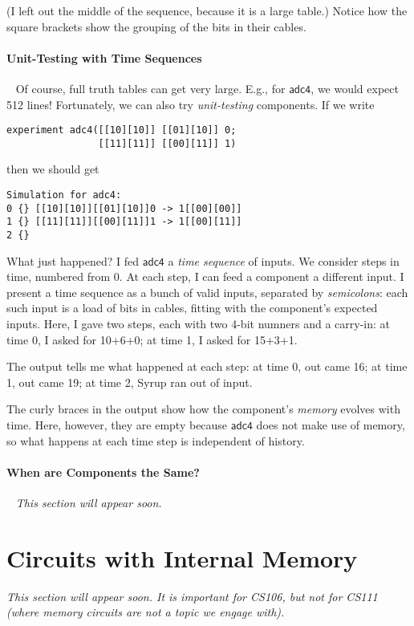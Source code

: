 \documentclass{article}
\newcommand{\C}{\mathsf}
\begin{document}
(I left out the middle of the sequence, because it is a large table.)
Notice how the square brackets show the grouping of the bits in their
cables.

\paragraph{Unit-Testing with Time Sequences}~
Of course, full truth tables can get very large. E.g., for $\C{adc4}$,
we would expect 512 lines! Fortunately, we can also try
\emph{unit-testing} components. If we write
\begin{verbatim}
experiment adc4([[10][10]] [[01][10]] 0;
                [[11][11]] [[00][11]] 1)
\end{verbatim}
then we should get
\begin{verbatim}
Simulation for adc4:
0 {} [[10][10]][[01][10]]0 -> 1[[00][00]]
1 {} [[11][11]][[00][11]]1 -> 1[[00][11]]
2 {}
\end{verbatim}

What just happened? I fed $\C{adc4}$ a \emph{time sequence} of inputs.
We consider steps in time, numbered from 0. At each step, I can feed
a component a different input.  I present a time
sequence as a bunch of valid inputs, separated by \emph{semicolons}:
each such input is a load of bits in cables, fitting with the
component's expected inputs. Here, I gave two steps, each with two
4-bit numners and a carry-in: at time 0, I
asked for 10+6+0; at time 1, I asked for 15+3+1.

The output tells me what happened at each step: at time 0, out came
16; at time 1, out came 19; at time 2, Syrup ran out of input.

The curly braces in the output show how the component's \emph{memory}
evolves with time. Here, however, they are empty because $\C{adc4}$
does not make use of memory, so what happens at each time step is
independent of history.


\paragraph{When are Components the Same?}~
\emph{This section will appear soon.}


\section{Circuits with Internal Memory}

\emph{This section will appear soon. It is important for CS106, but
  not for CS111 (where memory circuits are not a topic we engage with).}
\end{document}

